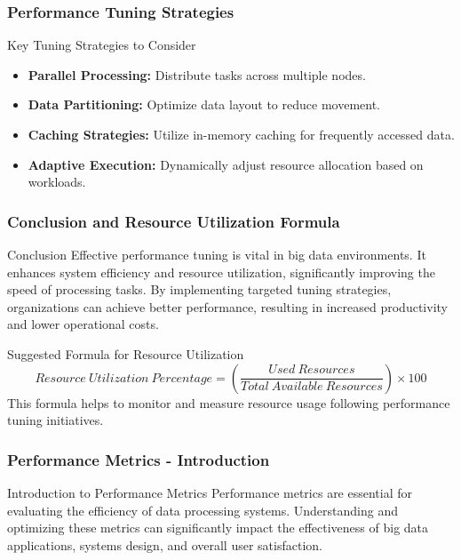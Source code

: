 \documentclass[aspectratio=169]{beamer}
\begin{document}
\begin{frame}[fragile]
    \frametitle{Performance Tuning Strategies}
    \begin{block}{Key Tuning Strategies to Consider}
        \begin{itemize}
            \item \textbf{Parallel Processing:} Distribute tasks across multiple nodes.
            \item \textbf{Data Partitioning:} Optimize data layout to reduce movement.
            \item \textbf{Caching Strategies:} Utilize in-memory caching for frequently accessed data.
            \item \textbf{Adaptive Execution:} Dynamically adjust resource allocation based on workloads.
        \end{itemize}
    \end{block}
\end{frame}

\begin{frame}[fragile]
    \frametitle{Conclusion and Resource Utilization Formula}
    \begin{block}{Conclusion}
        Effective performance tuning is vital in big data environments. It enhances system efficiency and resource utilization, significantly improving the speed of processing tasks. By implementing targeted tuning strategies, organizations can achieve better performance, resulting in increased productivity and lower operational costs.
    \end{block}

    \begin{block}{Suggested Formula for Resource Utilization}
        \[
        Resource\ Utilization\ Percentage = \left( \frac{Used\ Resources}{Total\ Available\ Resources} \right) \times 100
        \]
        This formula helps to monitor and measure resource usage following performance tuning initiatives.
    \end{block}
\end{frame}

\begin{frame}[fragile]
    \frametitle{Performance Metrics - Introduction}
    \begin{block}{Introduction to Performance Metrics}
        Performance metrics are essential for evaluating the efficiency of data processing systems. 
        Understanding and optimizing these metrics can significantly impact the effectiveness of big data applications, systems design, and overall user satisfaction.
    \end{block}
\end{frame}
\end{document}
